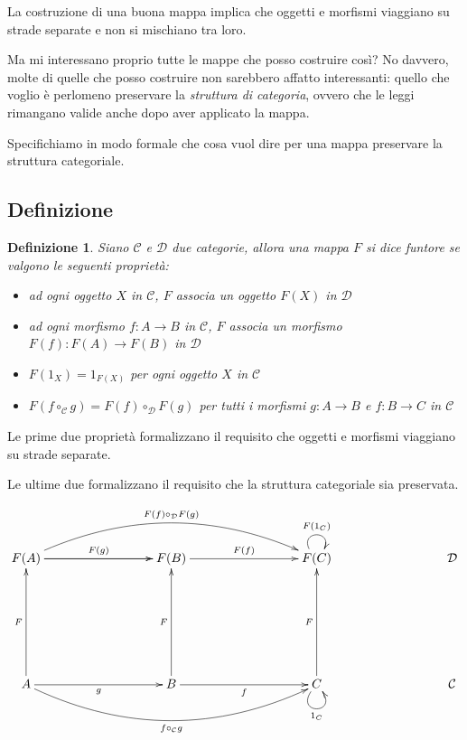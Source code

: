 \documentclass[12pt]{article}
\newtheorem{definition}{Definizione}[section]
\begin{document}
La costruzione di una buona mappa implica che oggetti e morfismi viaggiano su strade separate e non si mischiano tra loro.

Ma mi interessano proprio tutte le mappe che posso costruire così? No davvero, molte di quelle che posso costruire
non sarebbero affatto interessanti: quello che voglio è perlomeno preservare la \emph{struttura di categoria},
ovvero che le leggi rimangano valide anche dopo aver applicato la mappa.

Specifichiamo in modo formale che cosa vuol dire per una mappa preservare la struttura categoriale.

\subsection{Definizione}

\begin{definition}
Siano $\mathcal{C}$ e $\mathcal{D}$ due categorie, allora una mappa $F$ si dice \emph{funtore} se valgono le seguenti proprietà:

\begin{itemize}
  \item ad ogni oggetto $X$ in $\mathcal{C}$, $F$ associa un oggetto $F(X)$ in $\mathcal{D}$
  \item ad ogni morfismo $f: A \rightarrow B$ in $\mathcal{C}$, $F$ associa un morfismo $F(f): F(A) \rightarrow F(B)$ in $\mathcal{D}$
  \item $F(1_X) = 1_{F(X)}$ per ogni oggetto $X$ in $\mathcal{C}$
  \item $F(f \circ_\mathcal{C} g) = F(f) \circ_\mathcal{D} F(g)$ per tutti i morfismi $g: A \rightarrow B$ e $f: B \rightarrow C$ in $\mathcal{C}$
\end{itemize}

\end{definition}

Le prime due proprietà formalizzano il requisito che oggetti e morfismi viaggiano su strade separate.

Le ultime due formalizzano il requisito che la struttura categoriale sia preservata.

\[
\xymatrixrowsep{3cm}
\xymatrixcolsep{3cm}
\xymatrix{
  F(A) \ar[r]^{F(g)} \ar[r] \ar@/^1cm/[rr]^{F(f) \circ_\mathcal{D} F(g)} & F(B) \ar[r]^{F(f)} & F(C) \ar@(ul,ur)^{F(1_C)} & \mathcal{D} \\
  A \ar[u]^F \ar[r]_g \ar@/_1cm/[rr]_{f \circ_\mathcal{C} g}  & B \ar[u]^F \ar[r]_f & C \ar[u]^F \ar@(dl,dr)_{1_C} & \mathcal{C}
}
\]
\end{document}

